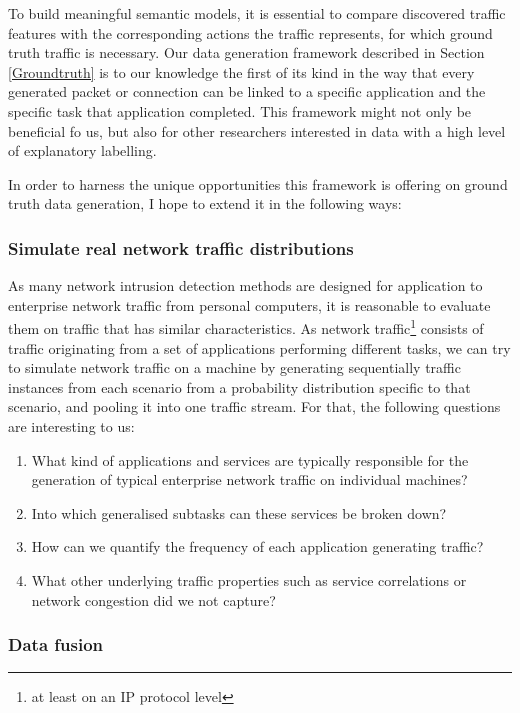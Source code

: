 \documentclass[a4paper,12pt,twoside]{report}
\begin{document}
To build meaningful semantic models, it is essential to compare discovered traffic features with the corresponding actions the traffic represents, for which ground truth traffic is necessary. Our data generation framework described in Section \ref{Groundtruth} is to our knowledge the first of its kind in the way that every generated packet or connection can be linked to a specific application and the specific task that application completed. This framework might not only be beneficial fo us, but also for other researchers interested in data with a high level of explanatory labelling.

In order to harness the unique opportunities this framework is offering on ground truth data generation, I hope to extend it in the following ways:

\subsubsection{Simulate real network traffic distributions}

As many network intrusion detection methods are designed for application to enterprise network traffic from personal computers, it is reasonable to evaluate them on traffic that has similar characteristics. As network traffic\footnote{at least on an IP protocol level} consists of traffic originating from a set of applications performing different tasks, we can try to simulate network traffic on a machine by generating sequentially traffic instances from each scenario from a probability distribution specific to that scenario, and  pooling it into one traffic stream. For that, the following questions are interesting to us:
\begin{enumerate}
\item What kind of applications and services are typically responsible for the generation of typical enterprise network traffic on individual machines?
\item Into which generalised subtasks can these services be broken down?
\item How can we quantify the frequency of each application generating traffic?
\item What other underlying traffic properties such as service correlations or network congestion did we not capture?
\end{enumerate}

\subsubsection{Data fusion}
\end{document}
